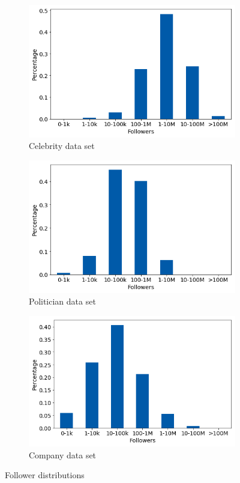 \begin{figure}[h]
\centering
\begin{subfigure}{.33\textwidth}
  \centering
  \includegraphics[width=.95\linewidth]{img/celeb_follow_distr}
  \caption{Celebrity data set}
  \label{fig:follow_distr_sub1}
\end{subfigure}%
\begin{subfigure}{.33\textwidth}
  \centering
  \includegraphics[width=.95\linewidth]{img/polit_follow_distr}
  \caption{Politician data set}
  \label{fig:follow_distr_sub2}
\end{subfigure}
\begin{subfigure}{.33\textwidth}
  \centering
  \includegraphics[width=.95\linewidth]{img/corp_follow_distr}
  \caption{Company data set}
  \label{fig:follow_distr_sub3}
\end{subfigure}%
\caption{Follower distributions}
\label{fig:follow_distr}
\end{figure}

